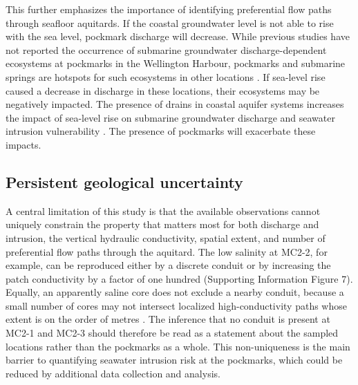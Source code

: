 \documentclass[draft, 10pt]{agujournal2019}
\begin{document}
This further emphasizes the importance of identifying preferential flow paths through seafloor aquitards. If the coastal groundwater level is not able to rise with the sea level,
pockmark discharge will decrease.
While previous studies have not reported the occurrence of submarine groundwater discharge-dependent ecosystems at pockmarks in the Wellington Harbour,
pockmarks and submarine springs are hotspots for such ecosystems in other locations \cite{purkamo_impact_2022, idczak_geophysical_2020, taniguchi_submarine_2019}.
If sea-level rise caused a decrease in discharge in these locations, their ecosystems may be negatively impacted.
The presence of drains in coastal aquifer systems increases the impact of sea-level rise on submarine groundwater discharge and seawater intrusion vulnerability \cite{michael_global_2013, morgan_sea-level_2024, seibert_understanding_2024}.
The presence of pockmarks will exacerbate these impacts.

\subsection{Persistent geological uncertainty}

A central limitation of this study is that the available observations cannot uniquely constrain the property that matters most for both discharge and intrusion,
the vertical hydraulic conductivity, spatial extent, and number of preferential flow paths through the aquitard.
The low salinity at MC2-2, for example, can be reproduced either by a discrete conduit or by increasing the patch conductivity by a factor of one hundred (Supporting Information Figure 7).
Equally, an apparently saline core does not exclude a nearby conduit,
because a small number of cores may not intersect localized high-conductivity paths whose extent is on the order of metres \cite{hoffmann_fresh_2023}.
The inference that no conduit is present at MC2-1 and MC2-3 should therefore be read as a statement about the sampled locations rather than the pockmarks as a whole.
This non-uniqueness is the main barrier to quantifying seawater intrusion risk at the pockmarks, which could be reduced by additional data collection and analysis.
\end{document}

